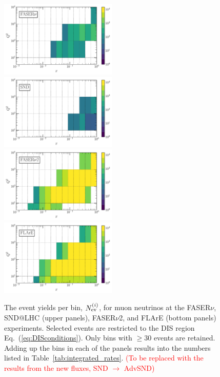 \begin{figure}[t]
    \centering
    \includegraphics[width=0.495\textwidth]{plots/FPF-FASERv.pdf}
    \includegraphics[width=0.495\textwidth]{plots/FPF-SND.pdf}
    \includegraphics[width=0.495\textwidth]{plots/FPF-FASERv2.pdf}
    \includegraphics[width=0.495\textwidth]{plots/FPF-FLArE100.pdf}
    \caption{\small The event yields per bin, $N_{\rm ev}^{(i)}$, for muon neutrinos at the
      FASER$\nu$, SND@LHC (upper panels), FASER$\nu$2, and FLArE (bottom panels) experiments.
      Selected events are restricted to the DIS region Eq.~(\ref{eq:DISconditions}).
      Only bins with $\ge 30$ events are retained.
	Adding up the bins in each of the panels results into the numbers listed in
	Table~\ref{tab:integrated_rates}.
	\textcolor{red}{(To be replaced with the results from the new fluxes, SND $\to$ AdvSND)}}
    \label{fig:fasernu2_muon}
\end{figure}

